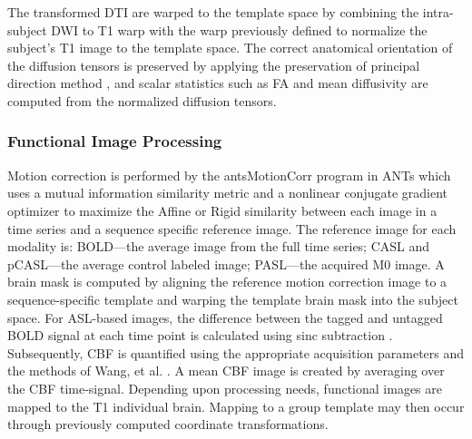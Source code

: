 The transformed DTI are warped to the template space by combining the intra-subject DWI to T1 warp with the warp previously defined to normalize the subject's T1 image to the template space. The correct anatomical orientation of the diffusion tensors is preserved by applying the preservation of principal direction method \cite{Alexander2001}, and scalar statistics such as FA and mean diffusivity are computed from the normalized diffusion tensors.


\subsubsection{Functional Image Processing}

Motion correction is performed by the 
antsMotionCorr program in ANTs which uses a mutual information similarity metric and
a nonlinear conjugate gradient optimizer to maximize the Affine or
Rigid similarity between each image in a time series and a sequence specific reference
image. The reference image for each modality is: BOLD---the average image from the full time
series; CASL and pCASL---the average control labeled image; PASL---the
acquired M0 image.  A brain mask is computed by aligning the reference
motion correction image to a sequence-specific 
template and warping the template brain mask into the subject
space. For ASL-based images, the difference between the tagged and
untagged BOLD signal at each time point is calculated using sinc
subtraction \cite{Liu2005}.  Subsequently, CBF is
quantified using the appropriate acquisition parameters and the
methods of Wang, et al. \cite{Wang2003}. A mean CBF image is created by
averaging over the CBF time-signal. Depending upon processing needs, functional images are
mapped to the T1 individual brain.  Mapping to a group template may
then occur through previously computed coordinate transformations.

